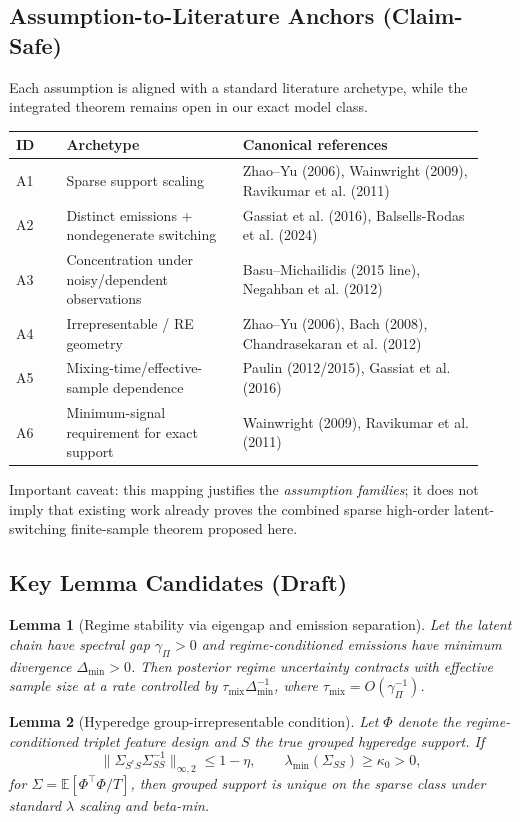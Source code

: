 \documentclass[11pt]{article}
\newtheorem{lemma}{Lemma}
\begin{document}
\subsection{Assumption-to-Literature Anchors (Claim-Safe)}
Each assumption is aligned with a standard literature archetype, while the integrated
theorem remains open in our exact model class.
\begin{center}
\begin{tabular}{p{0.1\linewidth} p{0.35\linewidth} p{0.48\linewidth}}
\toprule
ID & Archetype & Canonical references \\
\midrule
A1 & Sparse support scaling & Zhao--Yu (2006), Wainwright (2009), Ravikumar et al. (2011) \\
A2 & Distinct emissions + nondegenerate switching & Gassiat et al. (2016), Balsells-Rodas et al. (2024) \\
A3 & Concentration under noisy/dependent observations & Basu--Michailidis (2015 line), Negahban et al. (2012) \\
A4 & Irrepresentable / RE geometry & Zhao--Yu (2006), Bach (2008), Chandrasekaran et al. (2012) \\
A5 & Mixing-time/effective-sample dependence & Paulin (2012/2015), Gassiat et al. (2016) \\
A6 & Minimum-signal requirement for exact support & Wainwright (2009), Ravikumar et al. (2011) \\
\bottomrule
\end{tabular}
\end{center}
\noindent
Important caveat: this mapping justifies the \emph{assumption families}; it does not imply
that existing work already proves the combined sparse high-order latent-switching
finite-sample theorem proposed here.

\subsection{Key Lemma Candidates (Draft)}
\begin{lemma}[Regime stability via eigengap and emission separation]
Let the latent chain have spectral gap $\gamma_\Pi>0$ and regime-conditioned emissions
have minimum divergence $\Delta_{\min}>0$. Then posterior regime uncertainty contracts
with effective sample size at a rate controlled by
$\tau_{\mathrm{mix}}\Delta_{\min}^{-1}$, where $\tau_{\mathrm{mix}}=O(\gamma_\Pi^{-1})$.
\end{lemma}

\begin{lemma}[Hyperedge group-irrepresentable condition]
Let $\Phi$ denote the regime-conditioned triplet feature design and $S$ the true grouped
hyperedge support. If
\[
\|\Sigma_{S^cS}\Sigma_{SS}^{-1}\|_{\infty,2}\le 1-\eta,\qquad
\lambda_{\min}(\Sigma_{SS})\ge \kappa_0>0,
\]
for $\Sigma=\mathbb{E}[\Phi^\top\Phi/T]$, then grouped support is unique on the sparse
class under standard $\lambda$ scaling and beta-min.
\end{lemma}
\end{document}
